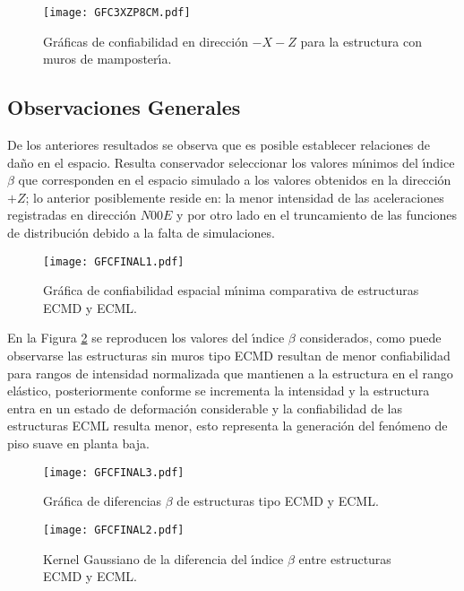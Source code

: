 \begin{figure} [htbp]
\centering
\texttt{[image: GFC3XZP8CM.pdf]}
\caption{Gr\'aficas de confiabilidad en direcci\'on $-X-Z$ para la estructura con muros de mamposter\'{\i}a.}
\label{fig:rf82}
\end{figure}

\newpage

\subsection{Observaciones Generales}

De los anteriores resultados se observa que es posible establecer relaciones de da\~no en el espacio. Resulta conservador seleccionar los valores m\'{\i}nimos del \'{\i}ndice $\beta$ que corresponden en el espacio simulado a los valores obtenidos en la direcci\'on $+Z$; lo anterior posiblemente reside en: la menor intensidad de las aceleraciones registradas en direcci\'on $N00E$ y por otro lado en el truncamiento de las funciones de distribuci\'on debido a la falta de simulaciones. 

\begin{figure} [htbp]
\centering
\texttt{[image: GFCFINAL1.pdf]}
\caption{Gr\'afica de confiabilidad espacial m\'{\i}nima comparativa de estructuras ECMD y ECML.}
\label{fig:rf83}
\end{figure}

En la Figura \ref{fig:rf83} se reproducen los valores del \'{\i}ndice $\beta$ considerados, como puede observarse las estructuras sin muros tipo ECMD resultan de menor confiabilidad para rangos de intensidad normalizada que mantienen a la estructura en el rango el\'astico, posteriormente conforme se incrementa la intensidad y la estructura entra en un estado de deformaci\'on considerable y la confiabilidad de las estructuras ECML resulta menor, esto representa la generaci\'on del fen\'omeno de piso suave en planta baja.

\begin{figure} [htbp]
\centering
\texttt{[image: GFCFINAL3.pdf]}
\caption{Gr\'afica de diferencias $\beta$ de estructuras tipo ECMD y ECML.}
\label{fig:rf84}
\end{figure}

\newpage

\begin{figure} [htbp]
\centering
\texttt{[image: GFCFINAL2.pdf]}
\caption{Kernel Gaussiano de la diferencia del \'{\i}ndice $\beta$ entre estructuras ECMD y ECML.}
\label{fig:rf85}
\end{figure}

